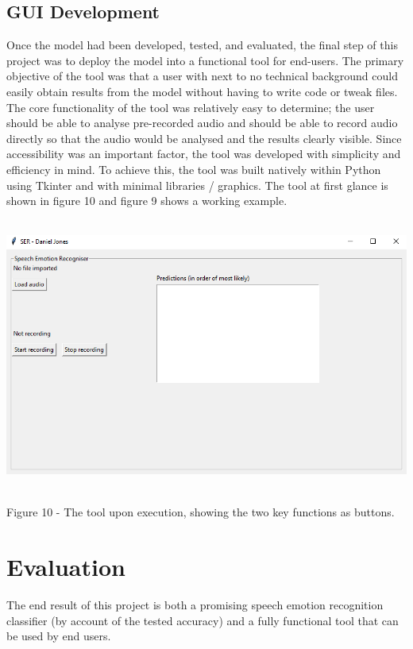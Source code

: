 \documentclass[12pt]{article}
\begin{document}
\subsection{GUI Development}
Once the model had been developed, tested, and evaluated, the final step of this project was to deploy the model into a functional tool for end-users. The primary objective of the tool was that a user with next to no technical background could easily obtain results from the model without having to write code or tweak files. The core functionality of the tool was relatively easy to determine; the user should be able to analyse pre-recorded audio and should be able to record audio directly so that the audio would be analysed and the results clearly visible. Since accessibility was an important factor, the tool was developed with simplicity and efficiency in mind. To achieve this, the tool was built natively within Python using Tkinter and with minimal libraries / graphics. The tool at first glance is shown in figure 10 and figure 9 shows a working example.
\begin{center}
\includegraphics[width=16cm, height=9cm]{figure_10_finished_tool}
\end{center}
Figure 10 - The tool upon execution, showing the two key functions as buttons.
\section{Evaluation}
The end result of this project is both a promising speech emotion recognition classifier (by account of the tested accuracy) and a fully functional tool that can be used by end users.
\\
\end{document}
